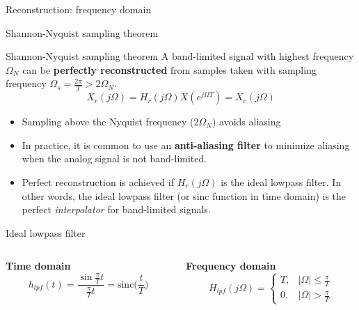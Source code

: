 \documentclass[10pt]{beamer}
\begin{document}
\begin{frame}{Reconstruction: frequency domain}
\begin{center}
	\resizebox{0.9\linewidth}{!}{}
\end{center}
\end{frame}

\begin{frame}{Shannon-Nyquist sampling theorem}

\begin{block}{Shannon-Nyquist sampling theorem}
	A band-limited signal with highest frequency $\Omega_N$ can be \textbf{perfectly reconstructed} from samples taken with sampling frequency $\Omega_s = \frac{2\pi}{T} > 2\Omega_N$.
	\begin{equation*}
	X_r(j\Omega) = H_r(j\Omega)X(e^{j\Omega T}) = X_c(j\Omega)
	\end{equation*}
\end{block}

\begin{itemize}
	\item Sampling above the Nyquist frequency ($2\Omega_N$) avoids aliasing 
	\item In practice, it is common to use an \textbf{anti-aliasing filter} to minimize aliasing when the analog signal is not band-limited.
	\item Perfect reconstruction is achieved if $H_r(j\Omega)$ is the ideal lowpass filter. In other words, the ideal lowpass filter (or sinc function in time domain) is the perfect \textit{interpolator} for band-limited signals.
\end{itemize}
\end{frame}

\begin{frame}[t]{Ideal lowpass filter}

\begin{columns}[t]
	\begin{column}{0.5\linewidth}
		\textbf{Time domain}
		\vspace{0.2cm}
		\begin{equation*}
			h_{lpf}(t) = \frac{\sin\frac{\pi}{T}t}{\frac{\pi}{T}t} = \mathrm{sinc}\Big(\frac{t}{T}\Big)
		\end{equation*}
	\end{column}
	
	\begin{column}{0.5\linewidth}
		\textbf{Frequency domain}
		\begin{equation*}
			H_{lpf}(j\Omega) = \begin{cases}
			T, & |\Omega|\leq\frac{\pi}{T} \\
			0, & |\Omega| > \frac{\pi}{T}
			\end{cases}
		\end{equation*}	
	\end{column}
\end{columns}
\begin{center}
	\resizebox{\linewidth}{!}{}
\end{center}
\end{frame}
\end{document}
